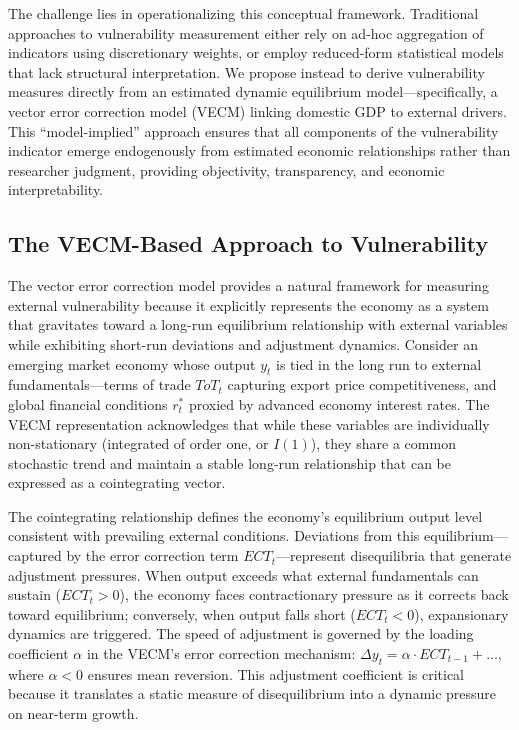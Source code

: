 \documentclass[12pt,a4paper]{article}
\numberwithin{equation}{section}
\theoremstyle{definition}
\theoremstyle{remark}
\begin{document}
The challenge lies in operationalizing this conceptual framework. Traditional approaches to vulnerability measurement either rely on ad-hoc aggregation of indicators using discretionary weights, or employ reduced-form statistical models that lack structural interpretation. We propose instead to derive vulnerability measures directly from an estimated dynamic equilibrium model---specifically, a vector error correction model (VECM) linking domestic GDP to external drivers. This ``model-implied'' approach ensures that all components of the vulnerability indicator emerge endogenously from estimated economic relationships rather than researcher judgment, providing objectivity, transparency, and economic interpretability.


\subsection{The VECM-Based Approach to Vulnerability}

The vector error correction model provides a natural framework for measuring external vulnerability because it explicitly represents the economy as a system that gravitates toward a long-run equilibrium relationship with external variables while exhibiting short-run deviations and adjustment dynamics. Consider an emerging market economy whose output $y_t$ is tied in the long run to external fundamentals---terms of trade $ToT_t$ capturing export price competitiveness, and global financial conditions $r_t^*$ proxied by advanced economy interest rates. The VECM representation acknowledges that while these variables are individually non-stationary (integrated of order one, or $I(1)$), they share a common stochastic trend and maintain a stable long-run relationship that can be expressed as a cointegrating vector.

The cointegrating relationship defines the economy's equilibrium output level consistent with prevailing external conditions. Deviations from this equilibrium---captured by the error correction term $ECT_t$---represent disequilibria that generate adjustment pressures. When output exceeds what external fundamentals can sustain ($ECT_t > 0$), the economy faces contractionary pressure as it corrects back toward equilibrium; conversely, when output falls short ($ECT_t < 0$), expansionary dynamics are triggered. The speed of adjustment is governed by the loading coefficient $\alpha$ in the VECM's error correction mechanism: $\Delta y_t = \alpha \cdot ECT_{t-1} + \ldots$, where $\alpha < 0$ ensures mean reversion. This adjustment coefficient is critical because it translates a static measure of disequilibrium into a dynamic pressure on near-term growth.
\end{document}
